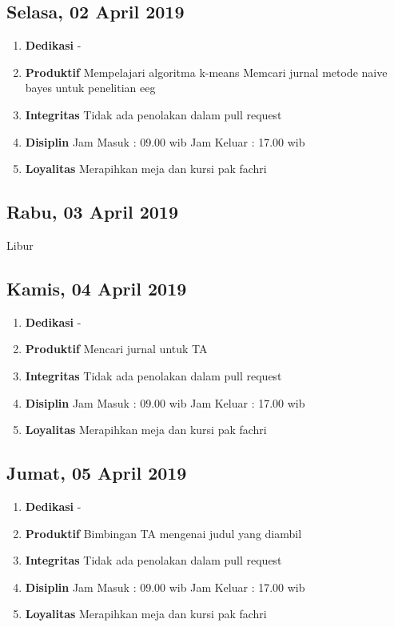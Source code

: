 \subsection{Selasa, 02 April 2019}
\begin{enumerate}
\item \textbf{Dedikasi}
\subitem -
\item \textbf{Produktif}
\subitem Mempelajari algoritma k-means 
\subitem Memcari jurnal metode naive bayes untuk penelitian eeg
\item \textbf{Integritas}
\subitem Tidak ada penolakan dalam pull request
\item \textbf{Disiplin}
\subitem Jam Masuk : 09.00 wib
\subitem Jam Keluar : 17.00 wib
\item \textbf{Loyalitas}
\subitem Merapihkan meja dan kursi pak fachri
\end{enumerate}

\subsection{Rabu, 03 April 2019}
Libur

\subsection{Kamis, 04 April 2019}
\begin{enumerate}
\item \textbf{Dedikasi}
\subitem -
\item \textbf{Produktif}
\subitem Mencari jurnal untuk TA 
\item \textbf{Integritas}
\subitem Tidak ada penolakan dalam pull request
\item \textbf{Disiplin}
\subitem Jam Masuk : 09.00 wib
\subitem Jam Keluar : 17.00 wib
\item \textbf{Loyalitas}
\subitem Merapihkan meja dan kursi pak fachri
\end{enumerate}

\subsection{Jumat, 05 April 2019}
\begin{enumerate}
\item \textbf{Dedikasi}
\subitem -
\item \textbf{Produktif}
\subitem Bimbingan TA mengenai judul yang diambil
\item \textbf{Integritas}
\subitem Tidak ada penolakan dalam pull request
\item \textbf{Disiplin}
\subitem Jam Masuk : 09.00 wib
\subitem Jam Keluar : 17.00 wib
\item \textbf{Loyalitas}
\subitem Merapihkan meja dan kursi pak fachri
\end{enumerate}

